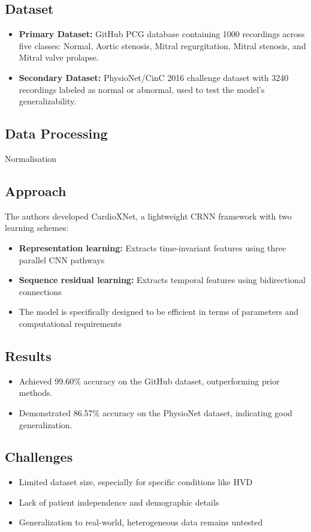 \subsection*{Dataset}
\begin{itemize}
    \item \textbf{Primary Dataset:} GitHub PCG database containing 1000 recordings across five classes: Normal, Aortic stenosis, Mitral regurgitation, Mitral stenosis, and Mitral valve prolapse.
    \item \textbf{Secondary Dataset:} PhysioNet/CinC 2016 challenge dataset with 3240 recordings labeled as normal or abnormal, used to test the model's generalizability.
\end{itemize}

\subsection*{Data Processing}
Normalisation

\subsection*{Approach}
The authors developed CardioXNet, a lightweight CRNN framework with two learning schemes:
\begin{itemize}
    \item \textbf{Representation learning:} Extracts time-invariant features using three parallel CNN pathways
    \item \textbf{Sequence residual learning:} Extracts temporal features using bidirectional connections
    \item The model is specifically designed to be efficient in terms of parameters and computational requirements
\end{itemize}

\subsection*{Results}
\begin{itemize}
    \item Achieved 99.60\% accuracy on the GitHub dataset, outperforming prior methods.
    \item Demonstrated 86.57\% accuracy on the PhysioNet dataset, indicating good generalization.
\end{itemize}

\subsection*{Challenges}
\begin{itemize}
    \item Limited dataset size, especially for specific conditions like HVD
    \item Lack of patient independence and demographic details
    \item Generalization to real-world, heterogeneous data remains untested
\end{itemize}

